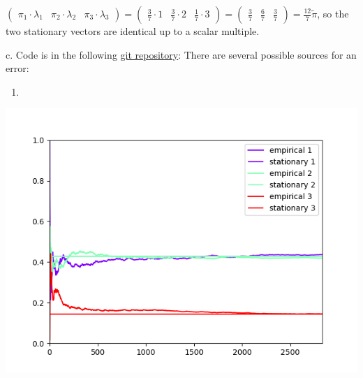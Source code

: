 \documentclass{article}
\begin{document}
$\begin{pmatrix}
    \pi_1\cdot\lambda_1 & \pi_2\cdot\lambda_2 & \pi_3\cdot\lambda_3
\end{pmatrix}=\begin{pmatrix}
    \frac{3}{7}\cdot{1} & \frac{3}{7}\cdot{2} & \frac{1}{7}\cdot{3}
\end{pmatrix}=\begin{pmatrix}
    \frac{3}{7} & \frac{6}{7} & \frac{3}{7}
\end{pmatrix}=\frac{12}{7}\tilde\pi$, so the two stationary vectors are identical up to a scalar multiple.

c. Code is in the following \href{https://github.com/HaimL76/ctmc1.git}{git repository}: 
There are several possible sources for an error:
\begin{enumerate}
    \item 
\end{enumerate}
\includegraphics{ctmc1.png}
\end{document}
